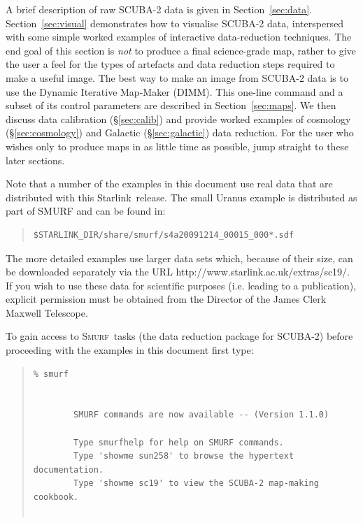 \documentclass[twoside,11pt]{article}
\newcommand{\htmladdnormallink}[2]{#1}
\newcommand{\xref}[3]{#1}
\renewcommand{\_}{\texttt{\symbol{95}}}
\newenvironment{myquote}{\begin{quote}\begin{small}}{\end{small}\end{quote}}
\newcommand{\starlink}{\htmladdnormallink{Starlink}{http://starlink.jach.hawaii.edu}}
\newcommand{\smurf}{\xref{\textsc{Smurf}}{sun258}{}}
\begin{document}
A brief description of raw SCUBA-2 data is given in
Section~\ref{sec:data}. Section~\ref{sec:visual} demonstrates how to
visualise SCUBA-2 data, interspersed with some simple worked examples
of interactive data-reduction techniques. The end goal of this section
is {\em not} to produce a final science-grade map, rather to give the
user a feel for the types of artefacts and data reduction steps
required to make a useful image. The best way to make an image from
SCUBA-2 data is to use the Dynamic Iterative Map-Maker (DIMM). This
one-line command and a subset of its control parameters are described
in Section~\ref{sec:maps}. We then discuss data calibration
(\S\ref{sec:calib}) and provide worked examples of cosmology
(\S\ref{sec:cosmology}) and Galactic (\S\ref{sec:galactic}) data
reduction. For the user who wishes only to produce maps in as little
time as possible, jump straight to these later sections.

Note that a number of the examples in this document use real data that
are distributed with this \starlink\ release. The small Uranus example
is distributed as part of SMURF and can be found in:

\begin{myquote}
\begin{verbatim}
$STARLINK_DIR/share/smurf/s4a20091214_00015_000*.sdf
\end{verbatim}
\end{myquote}

The more detailed examples use larger data sets which, because of
their size, can be downloaded separately via the URL
\htmladdnormallink{http://www.starlink.ac.uk/extras/sc19/}{http://www.starlink.ac.uk/extras/sc19/}.
If you wish to use these data for scientific purposes (i.e. leading to
a publication), explicit permission must be obtained from the Director
of the James Clerk Maxwell Telescope.

To gain access to \smurf\ tasks (the data reduction package for
SCUBA-2) before proceeding with the examples in this document first
type:

\begin{myquote}
\begin{verbatim}
% smurf


        SMURF commands are now available -- (Version 1.1.0)

        Type smurfhelp for help on SMURF commands.
        Type 'showme sun258' to browse the hypertext documentation.
        Type 'showme sc19' to view the SCUBA-2 map-making cookbook.


\end{verbatim}
\end{myquote}
%
\end{document}
